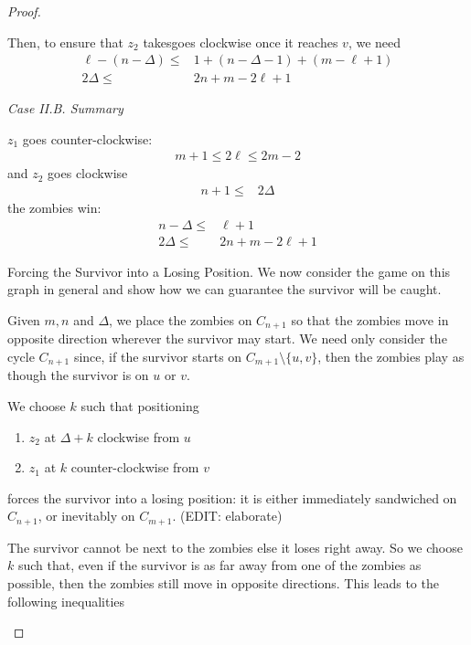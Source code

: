 \documentclass[letterpaper, 10pt]{article}
\begin{document}
\begin{proof}
\begin{proofpart}
  Then, to ensure that $z_2$ takesgoes clockwise once
  it reaches $v$, we need
  \begin{align*}
   \ell - (n - \Delta) \leq & 1 + (n - \Delta - 1) + (m - \ell + 1) \\
   2 \Delta \leq            & 2n + m - 2\ell + 1
  \end{align*}

  \textit{Case II.B. Summary}

  $z_1$ goes counter-clockwise:
  \begin{align*}
   m + 1 \leq 2 \ell \leq 2m - 2
  \end{align*}
  and $z_2$ goes clockwise
  \begin{align*}
   n+1 \leq & 2 \Delta
  \end{align*}
  the zombies win:
  \begin{align*}
   n - \Delta \leq & \ell + 1           \\
   2 \Delta \leq   & 2n + m - 2\ell + 1
  \end{align*}


 \end{proofpart}

 \begin{proofpart} Forcing the Survivor into a Losing Position.
  We now consider the game on this graph in general and show
  how we can guarantee the survivor will be caught.

  Given $m, n$ and $\Delta$, we place the
  zombies on $C_{n+1}$ so that the zombies move in
  opposite direction wherever the survivor may start.
  We need only consider the cycle $C_{n+1}$ since, if the survivor
  starts on $C_{m+1} \setminus \{u, v\}$, then the zombies play as
  though the survivor is on $u$ or $v$.

  We choose $k$ such that positioning
  \begin{enumerate}
   \item $z_2$ at $\Delta + k$ clockwise from $u$
   \item $z_1$ at $k$ counter-clockwise from $v$
  \end{enumerate}
  forces the survivor into a losing position: it is either immediately sandwiched on $C_{n+1}$, or inevitably on $C_{m+1}$. (EDIT: elaborate)

  The survivor cannot be next to the zombies else it loses right away.
  So we choose $k$ such that, even if the survivor is as far
  away from one of the zombies as possible, then the zombies still move in opposite directions. This leads to the following inequalities



\end{proofpart}
\end{proof}
\end{document}

